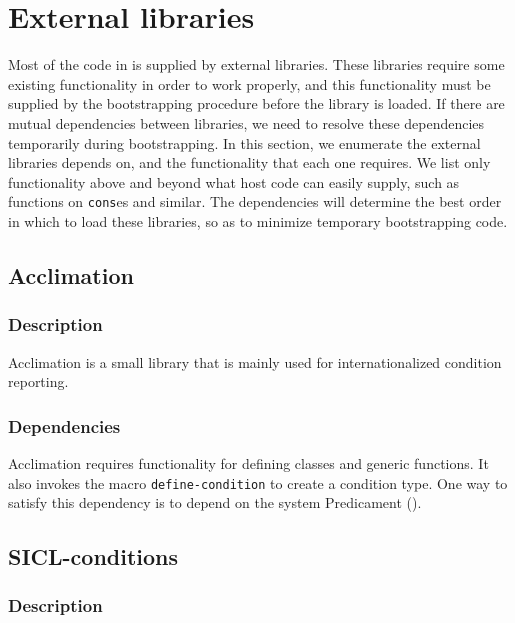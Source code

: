 \section{External libraries}

Most of the code in \sysname{} is supplied by external libraries.
These libraries require some existing functionality in order to work
properly, and this functionality must be supplied by the bootstrapping
procedure before the library is loaded.  If there are mutual
dependencies between libraries, we need to resolve these dependencies
temporarily during bootstrapping.  In this section, we enumerate the
external libraries \sysname{} depends on, and the functionality that
each one requires.  We list only functionality above and beyond what
host code can easily supply, such as functions on \texttt{cons}es and
similar.  The dependencies will determine the best order in which to
load these libraries, so as to minimize temporary bootstrapping code.

\subsection{Acclimation}

\subsubsection{Description}

Acclimation is a small library that is mainly used for
internationalized condition reporting.

\subsubsection{Dependencies}

Acclimation requires functionality for defining classes and generic
functions.  It also invokes the macro \texttt{define-condition} to
create a condition type.  One way to satisfy this dependency is to
depend on the system Predicament ().

\subsection{SICL-conditions}
\label{sec-sicl-conditions}

\subsubsection{Description}

